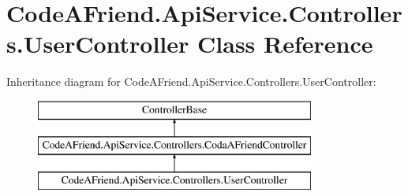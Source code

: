 \hypertarget{class_code_a_friend_1_1_api_service_1_1_controllers_1_1_user_controller}{}\section{Code\+A\+Friend.\+Api\+Service.\+Controllers.\+User\+Controller Class Reference}
\label{class_code_a_friend_1_1_api_service_1_1_controllers_1_1_user_controller}


 


Inheritance diagram for Code\+A\+Friend.\+Api\+Service.\+Controllers.\+User\+Controller\+:\begin{figure}[H]
\begin{center}
\leavevmode
\includegraphics[height=3.000000cm]{class_code_a_friend_1_1_api_service_1_1_controllers_1_1_user_controller}
\end{center}
\end{figure}
